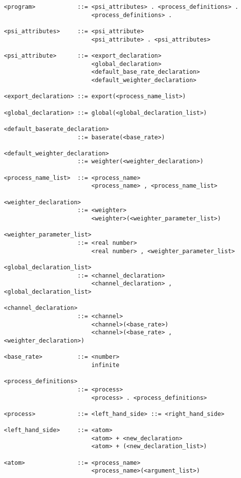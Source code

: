 \begin{verbatim}
<program>            ::= <psi_attributes> . <process_definitions> .
                         <process_definitions> .

<psi_attributes>     ::= <psi_attribute>
                         <psi_attribute> . <psi_attributes>

<psi_attribute>      ::= <export_declaration>
                         <global_declaration>
                         <default_base_rate_declaration>
                         <default_weighter_declaration>

<export_declaration> ::= export(<process_name_list>)

<global_declaration> ::= global(<global_declaration_list>)

<default_baserate_declaration>
                     ::= baserate(<base_rate>)

<default_weighter_declaration>
                     ::= weighter(<weighter_declaration>)

<process_name_list>  ::= <process_name>
                         <process_name> , <process_name_list>

<weighter_declaration>
                     ::= <weighter>
                         <weighter>(<weighter_parameter_list>)

<weighter_parameter_list>
                     ::= <real number>
                         <real number> , <weighter_parameter_list>

<global_declaration_list>
                     ::= <channel_declaration>
                         <channel_declaration> , <global_declaration_list>

<channel_declaration>
                     ::= <channel>
                         <channel>(<base_rate>)
                         <channel>(<base_rate> , <weighter_declaration>)

<base_rate>          ::= <number>
                         infinite

<process_definitions>
                     ::= <process>
                         <process> . <process_definitions>

<process>            ::= <left_hand_side> ::= <right_hand_side>

<left_hand_side>     ::= <atom>
                         <atom> + <new_declaration>
                         <atom> + (<new_declaration_list>)

<atom>               ::= <process_name>
                         <process_name>(<argument_list>)


\end{verbatim}
